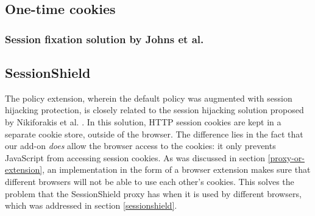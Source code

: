 
\subsection{One-time cookies}


\subsubsection{Session fixation solution by Johns et al.}


\subsection{SessionShield}
The policy extension, wherein the default policy was augmented with session hijacking protection, is closely related to the session hijacking solution proposed by Nikiforakis et al. \cite{Nikiforakis2010}. In this solution, HTTP session cookies are kept in a separate cookie store, outside of the browser. The difference lies in the fact that our add-on \emph{does} allow the browser access to the cookies: it only prevents JavaScript from accessing session cookies. As was discussed in section \ref{proxy-or-extension}, an implementation in the form of a browser extension makes sure that different browsers will not be able to use each other's cookies. This solves the problem that the SessionShield proxy has when it is used by different browsers, which was addressed in section \ref{sessionshield}.
